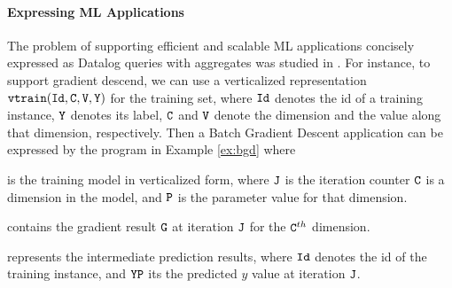 \documentclass[11pt]{article}
\def\inv{\vspace{-0.2cm}}
\def\sinv{\vspace{-0.1cm}}
\def\inv{\vspace{-0.2cm}}
\def\sinv{\vspace{-0.1cm}}
\begin{document}
\paragraph{\bf Expressing ML Applications}\label{subsec-express}
The problem of supporting efficient and scalable  ML applications concisely expressed
as Datalog queries with aggregates was studied in \cite{datalogml}. For instance, to support gradient descend, we
can  use a verticalized representation   $\tt vtrain({Id},{C},{V}, {Y})$ for the
 training set, where  $\tt Id$ denotes the id of a training instance, $\tt Y$ denotes its label, $\tt{C}$ and  $ \tt{V}$
 denote the dimension and the value along that dimension, respectively. Then a Batch Gradient Descent application
can be expressed by the program in Example \ref{ex:bgd} where
\begin{description}
	\inv\item [~~--~~$\tt model(J,C,P)$]   is the training model in verticalized form,  where
	$\tt J$  is the iteration counter $\tt C$  is a dimension in the model, and $\tt P$ is the parameter value for that dimension.
	\sinv\inv\item [~~--~~$\tt gradient(J,C,D)$]  contains the gradient result  $\tt G$  at  iteration  $\tt J$ for the ${\tt C}^{th}$ dimension.
	\sinv\inv\item [~~--~~$\tt predict(J, Id, YP)$] represents the intermediate prediction results, where $\tt Id$
	  denotes the id of the training instance, and $\tt YP$ its the predicted $y$ value at iteration  $\tt J$.
\end{description}
\end{document}
